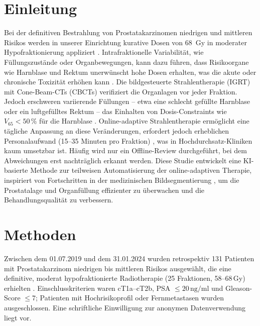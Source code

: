 \documentclass{article}
\begin{document}
\section{Einleitung}
Bei der definitiven Bestrahlung von Prostatakarzinomen niedrigen und mittleren
Risikos werden in unserer Einrichtung kurative Dosen von 68~Gy in moderater
Hypofraktionierung appliziert \citep{ethik2024}. Intrafraktionelle Variabilität,
wie Füllungszustände oder Organbewegungen, kann dazu führen, dass Risikoorgane
wie Harnblase und Rektum unerwünscht hohe Dosen erhalten, was die akute oder
chronische Toxizität erhöhen kann \citep{kupelian2007, quantec}. Die
bildgesteuerte Strahlentherapie (IGRT) mit Cone-Beam-CTs (CBCTs) verifiziert die
Organlagen vor jeder Fraktion. Jedoch erschweren variierende Füllungen – etwa
eine schlecht gefüllte Harnblase oder ein luftgefülltes Rektum – das Einhalten
von Dosis-Constraints wie \( V_{65} < 50\,\% \) für die Harnblase
\citep{wang2022, quantec}. Online-adaptive Strahlentherapie ermöglicht eine
tägliche Anpassung an diese Veränderungen, erfordert jedoch erheblichen
Personalaufwand (15–35 Minuten pro Fraktion) \citep{byrne2022}, was in
Hochdurchsatz-Kliniken kaum umsetzbar ist. Häufig wird nur ein Offline-Review
durchgeführt, bei dem Abweichungen erst nachträglich erkannt werden. Diese
Studie entwickelt eine KI-basierte Methode zur teilweisen Automatisierung der
online-adaptiven Therapie, inspiriert von Fortschritten in der medizinischen
Bildsegmentierung \citep{litjens2017}, um die Prostatalage und Organfüllung
effizienter zu überwachen und die Behandlungsqualität zu verbessern.


\section{Methoden}
Zwischen dem 01.07.2019 und dem 31.01.2024 wurden retrospektiv 131 Patienten mit
Prostatakarzinom niedrigen bis mittleren Risikos ausgewählt, die eine
definitive, moderat hypofraktionierte Radiotherapie (25 Fraktionen, 58–68\,Gy)
erhielten \citep{ethik2024}. Einschlusskriterien waren cT1a–cT2b, PSA \(\leq
20\,\text{ng/ml}\) und Gleason-Score \(\leq 7\); Patienten mit Hochrisikoprofil
oder Fernmetastasen wurden ausgeschlossen. Eine schriftliche Einwilligung zur
anonymen Datenverwendung liegt vor.
\end{document}
